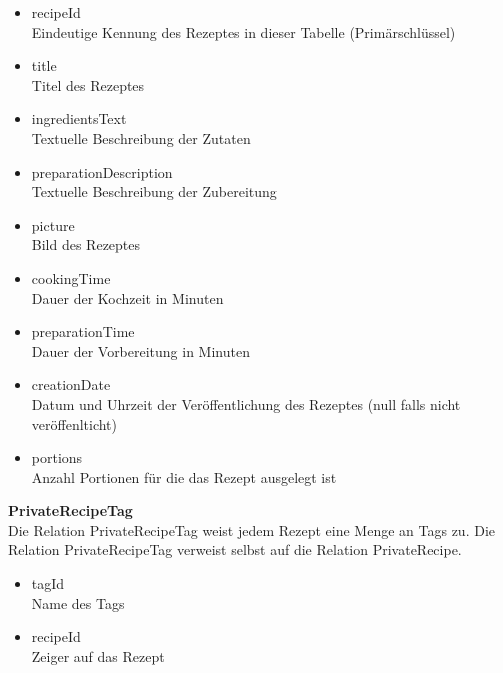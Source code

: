 \begin{itemize}
	\item recipeId \\ Eindeutige Kennung des Rezeptes in dieser Tabelle (Primärschlüssel)
	\item title \\ Titel des Rezeptes
	\item ingredientsText \\ Textuelle Beschreibung der Zutaten
	\item preparationDescription \\ Textuelle Beschreibung der Zubereitung
	\item picture \\ Bild des Rezeptes
	\item cookingTime \\ Dauer der Kochzeit in Minuten
	\item preparationTime \\ Dauer der Vorbereitung in Minuten
	\item creationDate \\ Datum und Uhrzeit der Veröffentlichung des Rezeptes (null falls nicht veröffenlticht)
	\item portions \\ Anzahl Portionen für die das Rezept ausgelegt ist 
\end{itemize}

\textbf{PrivateRecipeTag}\\
Die Relation PrivateRecipeTag weist jedem Rezept eine Menge an Tags zu. Die Relation PrivateRecipeTag verweist selbst auf die Relation PrivateRecipe.

\begin{itemize}
	\item tagId \\ Name des Tags
	\item recipeId \\ Zeiger auf das Rezept
\end{itemize}

